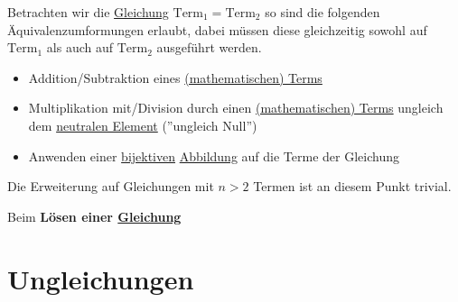 \documentclass[../../main.tex]{subfiles}
\begin{document}
	\begin{theorem}
		Betrachten wir die \hyperref[def:Gleichung]{Gleichung} $\textrm{Term}_1 = \textrm{Term}_2$ so sind die folgenden Äquivalenzumformungen erlaubt, dabei müssen diese gleichzeitig sowohl auf $\textrm{Term}_1$ als auch auf $\textrm{Term}_2$ ausgeführt werden. 
		
		\begin{itemize}
			\item Addition/Subtraktion eines \hyperref[def:MathematischerTerm]{(mathematischen) Terms}
			\item Multiplikation mit/Division durch einen \hyperref[def:MathematischerTerm]{(mathematischen) Terms} ungleich dem \hyperref[def:neutralesElement]{neutralen Element} (''ungleich Null'')
			\item Anwenden einer \hyperref[def:Bijektiv]{bijektiven} \hyperref[def:Abbildung]{Abbildung} auf die Terme der Gleichung
		\end{itemize}
	
		Die Erweiterung auf Gleichungen mit $n>2$ Termen ist an diesem Punkt trivial.
	\end{theorem}
	
	\begin{definition}
		\label{def:LösenEinerGleichung}
		Beim \textbf{Lösen einer \hyperref[def:Gleichung]{Gleichung}}
	\end{definition}
	
	\section{Ungleichungen}
	
	\begin{definition}[Ungleichung]
		\label{def:Ungleichung}
	\end{definition}
	
\end{document}
